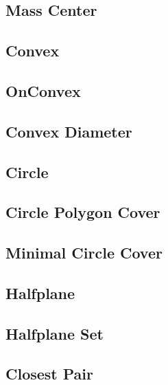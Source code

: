 \documentclass[10pt,twocolumn,oneside]{article}
\begin{document}
    \subsection{Mass Center}
    
    \subsection{Convex}
    
    \subsection{OnConvex}
    
    \subsection{Convex Diameter}
    
    \subsection{Circle}
    
    \subsection{Circle Polygon Cover}
    
    \subsection{Minimal Circle Cover}
    
    \subsection{Halfplane}
    
    \subsection{Halfplane Set}
    
    \subsection{Closest Pair}
    

\end{document}
